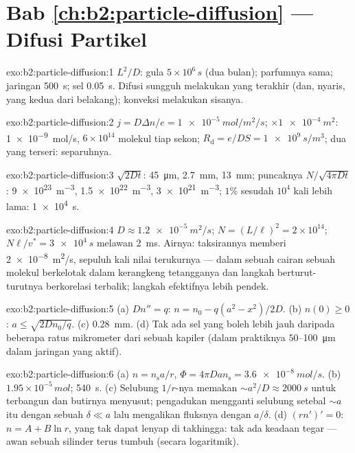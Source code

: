 \section*{Bab \ref{ch:b2:particle-diffusion} --- Difusi Partikel}

\begin{solution}{exo:b2:particle-diffusion:1}
$L^2/D$: gula $5 \times 10^6\,\unit{s}$ (dua bulan); parfumnya sama;
jaringan \qty{500}{s}; sel \qty{0.05}{s}. Difusi sungguh melakukan yang
terakhir (dan, nyaris, yang kedua dari belakang); konveksi melakukan sisanya.
\end{solution}

\begin{solution}{exo:b2:particle-diffusion:2}
$j = D\Delta n/e = \qty{1e-5}{mol/m^2/s}$; $\times \qty{1e-4}{m^2}$:
\qty{1e-9}{mol/s}, $6 \times 10^{14}$ molekul tiap sekon;
$R_{\text{d}} = e/DS = \qty{1e9}{s/m^3}$; dua yang terseri: separuhnya.
\end{solution}

\begin{solution}{exo:b2:particle-diffusion:3}
$\sqrt{2Dt}$: \qty{45}{\micro m}, \qty{2.7}{mm}, \qty{13}{mm}; puncaknya $N/\sqrt{4\pi
Dt}$: \qty{9e23}{m^{-3}}, \qty{1.5e22}{m^{-3}}, \qty{3e21}{m^{-3}}; $1\%$
sesudah $10^4$ kali lebih lama: \qty{1e4}{s}.
\end{solution}

\begin{solution}{exo:b2:particle-diffusion:4}
$D \approx \qty{1.2e-5}{m^2/s}$; $N = (L/\ell)^2 = 2 \times 10^{14}$; $N\ell/v^*
= \qty{3e4}{s}$ melawan \qty{2}{ms}. Airnya: taksirannya memberi
\qty{2e-8}{m^2/s}, sepuluh kali nilai terukurnya --- dalam sebuah cairan sebuah
molekul berkelotak dalam kerangkeng tetangganya dan langkah berturut-turutnya
berkorelasi terbalik; langkah efektifnya lebih pendek.
\end{solution}

\begin{solution}{exo:b2:particle-diffusion:5}
(a) $Dn'' = q$: $n = n_0 - q(a^2 - x^2)/2D$. (b) $n(0) \ge 0$: $a \le
\sqrt{2Dn_0/q}$. (c) \qty{0.28}{mm}. (d) Tak ada sel yang boleh lebih jauh daripada
beberapa ratus mikrometer dari sebuah kapiler (dalam praktiknya $50$--\qty{100}{\micro m}
dalam jaringan yang aktif).
\end{solution}

\begin{solution}{exo:b2:particle-diffusion:6}
(a) $n = n_{\text{s}}a/r$, $\Phi = 4\pi D a n_{\text{s}} = \qty{3.6e-8}{mol/s}$.
(b) $1.95 \times 10^{-5}\,\unit{mol}$; \qty{540}{s}. (c) Selubung $1/r$-nya memakan
$\sim a^2/D \approx \qty{2000}{s}$ untuk terbangun dan butirnya menyusut; pengadukan
mengganti selubung setebal $\sim a$ itu dengan sebuah  $\delta \ll a$
lalu mengalikan fluksnya dengan $a/\delta$. (d) $(rn')' = 0$: $n = A + B\ln r$,
yang tak dapat lenyap di takhingga: tak ada keadaan tegar --- awan sebuah
silinder terus tumbuh (secara logaritmik).
\end{solution}

